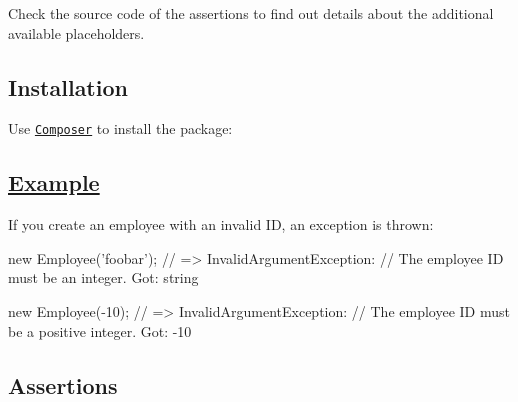 Check the source code of the assertions to find out details about the additional available placeholders.

\subsection*{Installation }

Use \href{https://getcomposer.org}{\tt Composer} to install the package\+:




\subsection*{\mbox{\hyperlink{class_example}{Example}} }




If you create an employee with an invalid ID, an exception is thrown\+:


\begin{DoxyCode}
\textcolor{keyword}{new} Employee(\textcolor{stringliteral}{'foobar'});
\textcolor{comment}{// => InvalidArgumentException: }
\textcolor{comment}{//    The employee ID must be an integer. Got: string}

\textcolor{keyword}{new} Employee(-10);
\textcolor{comment}{// => InvalidArgumentException: }
\textcolor{comment}{//    The employee ID must be a positive integer. Got: -10}
\end{DoxyCode}


\subsection*{Assertions }

